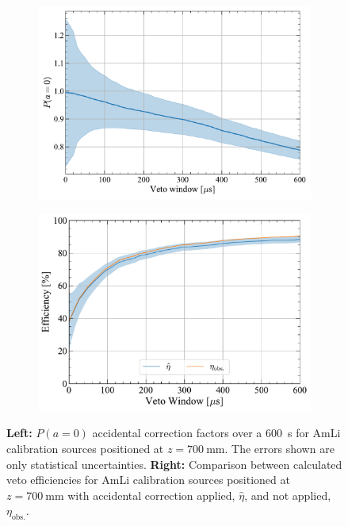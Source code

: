 \begin{figure}[!ht]
    \centering
    \begin{subfigure}[b]{0.49\textwidth}
        \centering
        \includegraphics[width=\textwidth]{figures/VetoEfficiency/SR3AmLi_700mm_Corrections_100k.pdf}
        \caption{}
        \label{fig:VetoEff/SR3AmLi_700mm_Corrections}
    \end{subfigure}
    \hfill
    \begin{subfigure}[b]{0.49\textwidth}
        \centering
        \includegraphics[width=\textwidth]{figures/VetoEfficiency/AmLiAccidentalCheck.pdf}
        \caption{}
        \label{fig:VetoEff/AmLiAccidentalCorrectionImpact}
    \end{subfigure}
    \caption[$P(a=0)$ accidental correction factors over a 600~\textmu s for AmLi calibration sources positioned at $z=700~\text{mm}$ alongside the veto efficiency with the corrections applied.]{\textbf{Left:} $P(a=0)$ accidental correction factors over a 600~\textmu s for AmLi calibration sources positioned at $z=700~\text{mm}$. The errors shown are only statistical uncertainties. \textbf{Right:} Comparison between calculated veto efficiencies for AmLi calibration sources positioned at $z=700~\text{mm}$ with accidental correction applied, $\hat{\eta}$, and not applied, $\eta_\text{obs.}$.}
    \label{fig:VetoEff/AmLiAccidentalPlots}
\end{figure}
